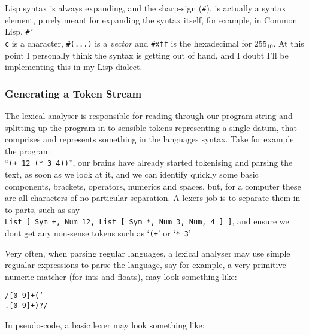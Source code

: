 \documentclass{article}
\newcommand{\code}[1]{\texttt{#1}}
\begin{document}
    Lisp syntax is always expanding, and the sharp-sign (\code{\#}), is actually
    a syntax element, purely meant for expanding the syntax itself, for example,
    in Common Lisp, \code{\#{\char`\\}c} is a character, \code{\#(...)} is a
    \emph{vector} and \code{\#xff} is the hexadecimal for $255_{10}$. At this point
    I personally think the syntax is getting out of hand, and I doubt I'll be
    implementing this in my Lisp dialect.

    \subsubsection{Generating a Token Stream}
      The lexical analyser is responsible for reading through our program string
      and splitting up the program in to sensible tokens representing a single
      datum, that comprises and represents something in the languages syntax.
      Take for example the program:\\``\code{(+ 12 (* 3 4))}'', our brains have
      already started tokenising and parsing the text, as soon as we look at it,
      and we can identify quickly some basic components, brackets, operators,
      numerics and spaces, but, for a computer these are all characters of no
      particular separation. A lexers job is to separate them in to parts, such
      as say\\\code{List [ Sym +, Num 12, List [ Sym *, Num 3, Num, 4 ] ]}, and
      ensure we dont get any non-sense tokens such as `\code{(+}' or `\code{* 3}'

      \clearpage

      Very often, when parsing regular languages, a lexical analyser may use
      simple regualar expressions to parse the language, say for example, a
      very primitive numeric matcher (for ints and floats), may look something
      like:

      \centerline{\code{/[0-9]+(\char`\\.[0-9]+)?/}}

      In pseudo-code, a basic lexer may look something like:
\end{document}
